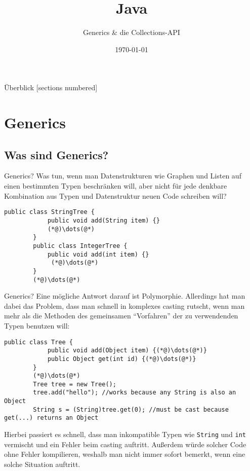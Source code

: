 

\usepackage{csquotes}

\title{Java}
\subtitle{Generics \& die Collections-API}
\date{\today}



\begin{frame}
\titlepage
\end{frame}

\begin{frame}{Überblick}
    [sections numbered]
    \tableofcontents
\end{frame}

\section{Generics}
\subsection{Was sind Generics?}
\begin{frame}[fragile]{Generics?}
    Was tun, wenn man Datenstrukturen wie Graphen und Listen auf einen bestimmten Typen beschränken will,
    aber nicht für jede denkbare Kombination aus Typen und Datenstruktur neuen Code schreiben will?
    \begin{lstlisting}[gobble=8,basicstyle=\ttfamily\scriptsize]
        public class StringTree {
            public void add(String item) {}
            (*@)\dots(@*)
        }
        public class IntegerTree {
            public void add(int item) {}
             (*@)\dots(@*)
        }
        (*@)\dots(@*)
    \end{lstlisting}
\end{frame}

\begin{frame}[fragile]{Generics?}
    Eine mögliche Antwort darauf ist Polymorphie.
    Allerdings hat man dabei das Problem, dass man schnell in komplexes casting rutscht,
    wenn man mehr als die Methoden des gemeinsamen \enquote{Vorfahren} der zu verwendenden Typen benutzen will:
    \begin{lstlisting}[gobble=8,basicstyle=\ttfamily\scriptsize]
        public class Tree {
            public void add(Object item) {(*@)\dots(@*)}
            public Object get(int id) {(*@)\dots(@*)}
        }
        (*@)\dots(@*)
        Tree tree = new Tree();
        tree.add("hello"); //works because any String is also an Object
        String s = (String)tree.get(0); //must be cast because get(...) returns an Object
    \end{lstlisting}
    \pause
    Hierbei passiert es schnell, dass man inkompatible Typen wie \texttt{String} und \texttt{int} vermischt und ein Fehler beim casting auftritt.
    Außerdem würde solcher Code ohne Fehler kompilieren, weshalb man nicht immer sofort bemerkt, wenn eine solche Situation auftritt.
\end{frame}

